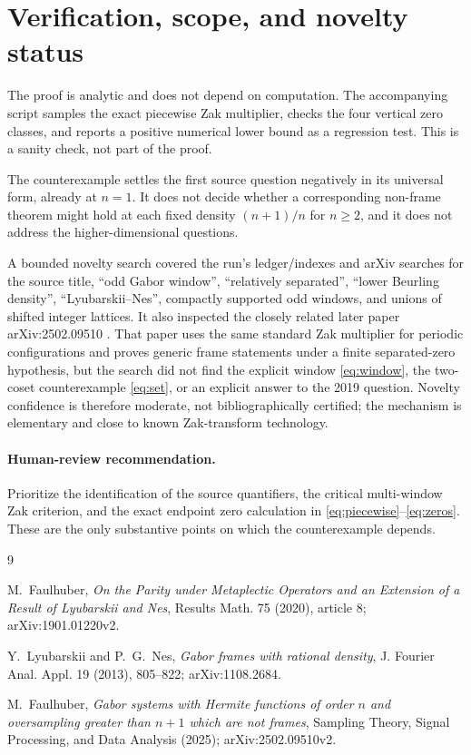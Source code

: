\documentclass[11pt]{article}
\begin{document}
\section{Verification, scope, and novelty status}

The proof is analytic and does not depend on computation.  The accompanying
script samples the exact piecewise Zak multiplier, checks the four vertical
zero classes, and reports a positive numerical lower bound as a regression
test.  This is a sanity check, not part of the proof.

The counterexample settles the first source question negatively in its
universal form, already at $n=1$.  It does not decide whether a corresponding
non-frame theorem might hold at each fixed density $(n+1)/n$ for $n\geq2$,
and it does not address the higher-dimensional questions.

A bounded novelty search covered the run's ledger/indexes and arXiv searches
for the source title, ``odd Gabor window'', ``relatively separated'',
``lower Beurling density'', ``Lyubarskii--Nes'', compactly supported odd
windows, and unions of shifted integer lattices.  It also inspected the
closely related later paper arXiv:2502.09510 \cite{Faulhuber2025}.  That paper
uses the same standard Zak multiplier for periodic configurations and proves
generic frame statements under a finite separated-zero hypothesis, but the
search did not find the explicit window \eqref{eq:window}, the two-coset
counterexample \eqref{eq:set}, or an explicit answer to the 2019 question.
Novelty confidence is therefore moderate, not bibliographically certified;
the mechanism is elementary and close to known Zak-transform technology.

\paragraph{Human-review recommendation.}
Prioritize the identification of the source quantifiers, the critical
multi-window Zak criterion, and the exact endpoint zero calculation in
\eqref{eq:piecewise}--\eqref{eq:zeros}.  These are the only substantive
points on which the counterexample depends.

\begin{thebibliography}{9}

M.~Faulhuber,
\emph{On the Parity under Metaplectic Operators and an Extension of a
Result of Lyubarskii and Nes}, Results Math. 75 (2020), article 8;
arXiv:1901.01220v2.

Y.~Lyubarskii and P.~G.~Nes,
\emph{Gabor frames with rational density}, J. Fourier Anal. Appl. 19
(2013), 805--822; arXiv:1108.2684.

M.~Faulhuber,
\emph{Gabor systems with Hermite functions of order $n$ and oversampling
greater than $n+1$ which are not frames}, Sampling Theory, Signal
Processing, and Data Analysis (2025); arXiv:2502.09510v2.

\end{thebibliography}
\end{document}
